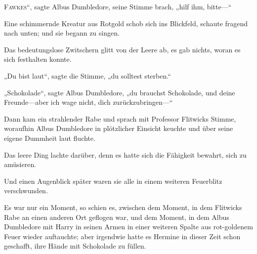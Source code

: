
\lettrine[ante=„]{F}{awkes}“, sagte Albus Dumbledore, seine Stimme brach, „hilf ihm, bitte—“

Eine schimmernde Kreatur aus Rotgold schob sich ins Blickfeld, schaute fragend nach unten; und sie begann zu singen.

Das bedeutungslose Zwitschern glitt von der Leere ab, es gab nichts, woran es sich festhalten konnte.

„Du bist laut“, sagte die Stimme, „du solltest sterben.“

„Schokolade“, sagte Albus Dumbledore, „du brauchst Schokolade, und deine Freunde—aber ich wage nicht, dich zurückzubringen—“

Dann kam ein strahlender Rabe und sprach mit Professor Flitwicks Stimme, woraufhin Albus Dumbledore in plötzlicher Einsicht keuchte und über seine eigene Dummheit laut fluchte.

Das leere Ding lachte darüber, denn es hatte sich die Fähigkeit bewahrt, sich zu amüsieren.

Und einen Augenblick später waren sie alle in einem weiteren Feuerblitz verschwunden.

\later

Es war nur ein Moment, so schien es, zwischen dem Moment, in dem Flitwicks Rabe an einen anderen Ort geflogen war, und dem Moment, in dem Albus Dumbledore mit Harry in seinen Armen in einer weiteren Spalte aus rot-goldenem Feuer wieder auftauchte; aber irgendwie hatte es Hermine in dieser Zeit schon geschafft, ihre Hände mit Schokolade zu füllen.


